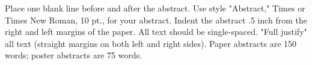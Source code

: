 \documentclass{article}
\title{     }
\author{     }
\date{     }
\begin{document}
Place one blank line before and after the abstract. Use style "Abstract," Times or Times New Roman, 10 pt., for your abstract. Indent the abstract .5 inch from the right and left margins of the paper. All text should be single-spaced. "Full justify" all text (straight margins
on both left and right sides). Paper abstracts are 150 words; poster abstracts are 75 words.
\end{document}
